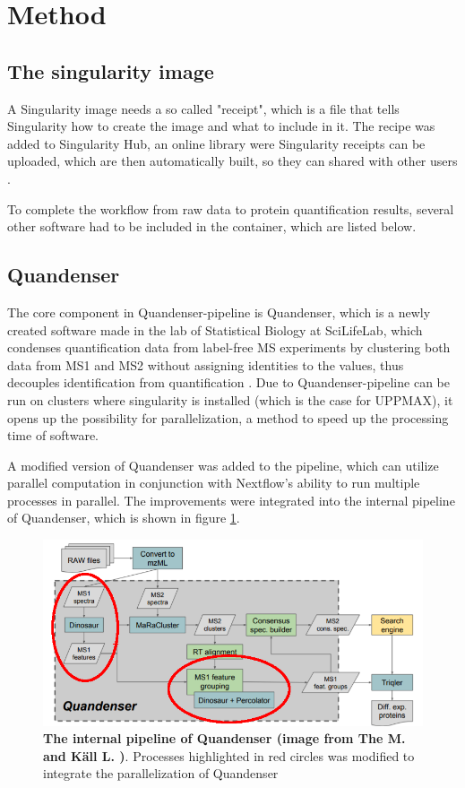 \section{Method}

\subsection{The singularity image}
A Singularity image needs a so called "receipt", which is a file that tells Singularity how to create the image and what to include in it. The recipe was added to Singularity Hub, an online library were Singularity receipts can be uploaded, which are then automatically built, so they can shared with other users \cite{singularity-hub}.

To complete the workflow from raw data to protein quantification results, several other software had to be included in the container, which are listed below.

\subsection{Quandenser} \label{ssec:quandenser-method}
 The core component in Quandenser-pipeline is Quandenser, which is a newly created software made in the lab of Statistical Biology at SciLifeLab, which condenses quantification data from label-free MS experiments by clustering both data from MS1 and MS2 without assigning identities to the values, thus decouples identification from quantification \cite{quandenser}. Due to Quandenser-pipeline can be run on clusters where singularity is installed (which is the case for UPPMAX), it opens up the possibility for parallelization, a method to speed up the processing time of software.

A modified version of Quandenser was added to the pipeline, which can utilize parallel computation in conjunction with Nextflow's ability to run multiple processes in parallel. The improvements were integrated into the internal pipeline of Quandenser, which is shown in figure \ref{fig:quandenser-internal-pipeline}.

\begin{figure}[H]
  \centering
  \includegraphics[width=\linewidth]{pictures/quandenser-internal.png}
  \caption{\textbf{The internal pipeline of Quandenser (image from The M. and Käll L. \cite{quandenser})}. Processes highlighted in red circles was modified to integrate the parallelization of Quandenser}
  \label{fig:quandenser-internal-pipeline}
\end{figure}

